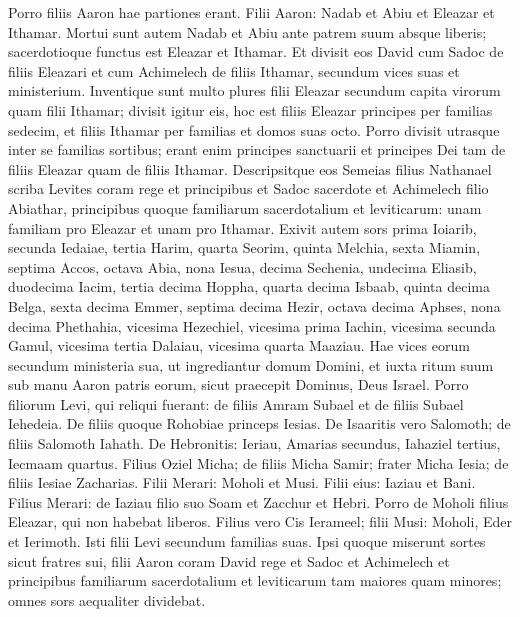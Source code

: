 \begin{biblechapter}  
\verse Porro filiis Aaron hae partiones erant. Filii Aaron: Nadab et Abiu et Eleazar et Ithamar. 
\verse Mortui sunt autem Nadab et Abiu ante patrem suum absque liberis; sacerdotioque functus est Eleazar et Ithamar. 
\verse Et divisit eos David cum Sadoc de filiis Eleazari et cum Achimelech de filiis Ithamar, secundum vices suas et ministerium. 
\verse Inventique sunt multo plures filii Eleazar secundum capita virorum quam filii Ithamar; divisit igitur eis, hoc est filiis Eleazar principes per familias sedecim, et filiis Ithamar per familias et domos suas octo. 
\verse Porro divisit utrasque inter se familias sortibus; erant enim principes sanctuarii et principes Dei tam de filiis Eleazar quam de filiis Ithamar. 
\verse Descripsitque eos Semeias filius Nathanael scriba Levites coram rege et principibus et Sadoc sacerdote et Achimelech filio Abiathar, principibus quoque familiarum sacerdotalium et leviticarum: unam familiam pro Eleazar et unam pro Ithamar. 
\verse Exivit autem sors prima Ioiarib, secunda Iedaiae, 
\verse tertia Harim, quarta Seorim, 
\verse quinta Melchia, sexta Miamin, 
\verse septima Accos, octava Abia,  
\verse nona Iesua, decima Sechenia, 
\verse undecima Eliasib, duodecima Iacim, 
\verse tertia decima Hoppha, quarta decima Isbaab, 
\verse quinta decima Belga, sexta decima Emmer, 
\verse septima decima Hezir, octava decima Aphses, 
\verse nona decima Phethahia, vicesima Hezechiel, 
\verse vicesima prima Iachin, vicesima secunda Gamul, 
\verse vicesima tertia Dalaiau, vicesima quarta Maaziau. 
\verse Hae vices eorum secundum ministeria sua, ut ingrediantur domum Domini, et iuxta ritum suum sub manu Aaron patris eorum, sicut praecepit Dominus, Deus Israel. 
\verse Porro filiorum Levi, qui reliqui fuerant: de filiis Amram Subael et de filiis Subael Iehedeia. 
\verse De filiis quoque Rohobiae princeps Iesias. 
\verse De Isaaritis vero Salomoth; de filiis Salomoth Iahath. 
\verse De Hebronitis: Ieriau, Amarias secundus, Iahaziel tertius, Iecmaam quartus. 
\verse Filius Oziel Micha; de filiis Micha Samir; 
\verse frater Micha Iesia; de filiis Iesiae Zacharias. 
\verse Filii Merari: Moholi et Musi. Filii eius: Iaziau et Bani.  
\verse Filius Merari: de Iaziau filio suo Soam et Zacchur et Hebri. 
\verse Porro de Moholi filius Eleazar, qui non habebat liberos. 
\verse Filius vero Cis Ierameel;  
\verse filii Musi: Moholi, Eder et Ierimoth. Isti filii Levi secundum familias suas. 
\verse Ipsi quoque miserunt sortes sicut fratres sui, filii Aaron coram David rege et Sadoc et Achimelech et principibus familiarum sacerdotalium et leviticarum tam maiores quam minores; omnes sors aequaliter dividebat. 
\end{biblechapter}

